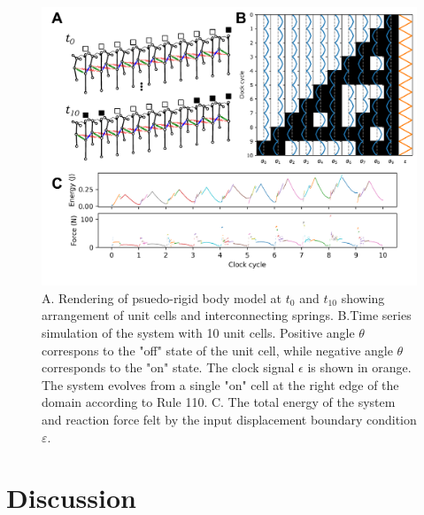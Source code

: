 \begin{figure}[H]
    \centering
    \includegraphics[width=\textwidth]{images/SVGs/Simulation.pdf}
    \caption{A. Rendering of psuedo-rigid body model at \(t_0\) and \(t_{10}\) showing arrangement of unit cells and interconnecting springs. B.Time series simulation of the system with 10 unit cells. Positive angle \(\theta\) correspons to the "off" state of the unit cell, while negative angle \(\theta\) corresponds to the "on" state. The clock signal \(\epsilon\) is shown in orange. The system evolves from a single "on" cell at the right edge of the domain according to Rule 110. C. The total energy of the system and reaction force felt by the input displacement boundary condition \(\varepsilon\).}
    \label{fig:Simulation}
\end{figure}




\section{Discussion}

